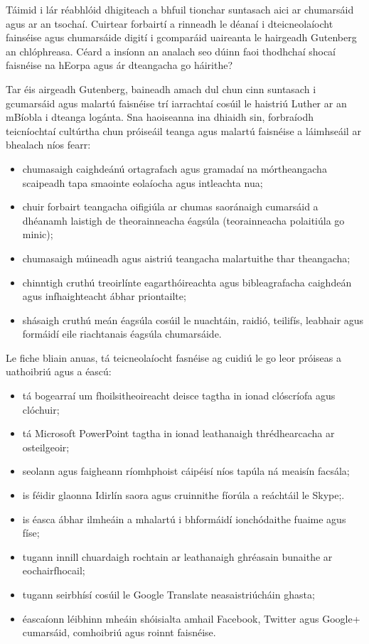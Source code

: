 \documentclass[]{../../metanetpaper}
\begin{document}
\begin{multicols}{2}

Táimid i lár réabhlóid dhigiteach a bhfuil tionchar suntasach aici ar chumarsáid agus ar an tsochaí. Cuirtear forbairtí a rinneadh le déanaí i dteicneolaíocht fainséise agus chumarsáide digití i gcomparáid uaireanta le hairgeadh Gutenberg an chlóphreasa. Céard a insíonn an analach seo dúinn faoi thodhchaí shocaí faisnéise na hEorpa agus ár dteangacha go háirithe?


Tar éis airgeadh Gutenberg, baineadh amach dul chun cinn suntasach i gcumarsáid agus malartú faisnéise trí iarrachtaí cosúil le haistriú Luther ar an mBíobla i dteanga logánta. Sna haoiseanna ina dhiaidh sin, forbraíodh teicníochtaí cultúrtha chun próiseáil teanga agus malartú faisnéise a láimhseáil ar bhealach níos fearr:

\medskip
\begin{itemize}
\item chumasaigh caighdeánú ortagrafach agus gramadaí na mórtheangacha scaipeadh tapa smaointe eolaíocha agus intleachta nua;
\item chuir forbairt teangacha oifigiúla ar chumas saoránaigh cumarsáid a dhéanamh laistigh de theorainneacha éagsúla (teorainneacha polaitiúla go minic);
\item chumasaigh múineadh agus aistriú teangacha malartuithe thar theangacha;
\item chinntigh cruthú treoirlínte eagarthóireachta agus bibleagrafacha caighdeán agus infhaighteacht ábhar priontailte;
\medskip
\item shásaigh cruthú meán éagsúla cosúil le nuachtáin, raidió, teilifís, leabhair agus formáidí eile riachtanais éagsúla chumarsáide.
\end{itemize}

Le fiche bliain anuas, tá teicneolaíocht fasnéise ag cuidiú le go leor próiseas a uathoibriú agus a éascú:

\begin{itemize}
\item tá bogearraí um fhoilsitheoireacht deisce tagtha in ionad clóscríofa agus clóchuir;
\item tá Microsoft PowerPoint tagtha in ionad leathanaigh thrédhearcacha ar osteilgeoir;
\item seolann agus faigheann ríomhphoist cáipéisí níos tapúla ná meaisín facsála;
\item is féidir glaonna Idirlín saora agus cruinnithe fíorúla a reáchtáil le Skype;.
\item is éasca ábhar ilmheáin a mhalartú i bhformáidí ionchódaithe fuaime agus físe;
\item tugann innill chuardaigh rochtain ar leathanaigh ghréasain bunaithe ar eochairfhocail;
\item tugann seirbhísí cosúil le Google Translate neasaistriúcháin ghasta;
\item éascaíonn léibhinn mheáin shóisialta amhail Facebook, Twitter agus Google+ cumarsáid, comhoibriú agus roinnt faisnéise.
\end{itemize}


\end{multicols}
\end{document}

